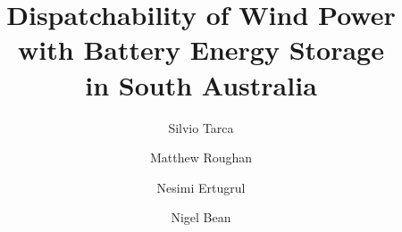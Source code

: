 \documentclass[3p,times,procedia]{elsarticle}
\begin{document}
\begin{frontmatter}
\enlargethispage{0pt}




\title{Dispatchability of Wind Power with Battery Energy Storage\\in South Australia}


\author[acems]{Silvio Tarca}
\author[acems]{Matthew Roughan}
\author[cet]{Nesimi Ertugrul}
\author[acems]{Nigel Bean}

\address[acems]{School of Mathematical Sciences and ARC Centre of Excellence for Mathematical \& Statistical Frontiers,\\The University of Adelaide, South Australia 5005}
\address[cet]{School of Electrical \& Electronic Engineering and Centre for Energy Technology,\\The University of Adelaide, South Australia 5005}


\end{frontmatter}
\end{document}
